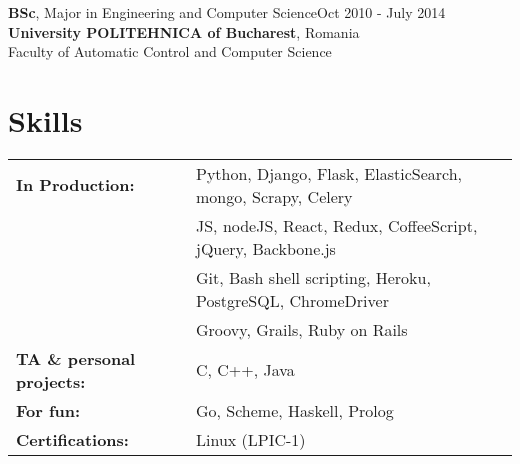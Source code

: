 \documentclass[line, margin]{resume}
\begin{document}
\begin{resume}
    \textbf{BSc}, Major in Engineering and Computer Science\hfill Oct 2010 - July 2014\\
    \textbf{University POLITEHNICA of Bucharest}, Romania\\
    Faculty of Automatic Control and Computer Science
\section{Skills}

\begin{tabular}[t]{@{} p{1.7in} p{3.8in} @{}}
\bf{In Production:} & Python, Django, Flask, ElasticSearch, mongo, Scrapy, Celery\\
    				& JS, nodeJS, React, Redux, CoffeeScript, jQuery, Backbone.js\\
                    & Git, Bash shell scripting, Heroku, PostgreSQL, ChromeDriver\\
                    & Groovy, Grails, Ruby on Rails\\
\bf{TA \& personal projects:} & C, C++, Java\\
\bf{For fun:} & Go, Scheme, Haskell, Prolog\\
\bf{Certifications:} & Linux (LPIC-1)
\end{tabular}

\end{resume}
\end{document}
